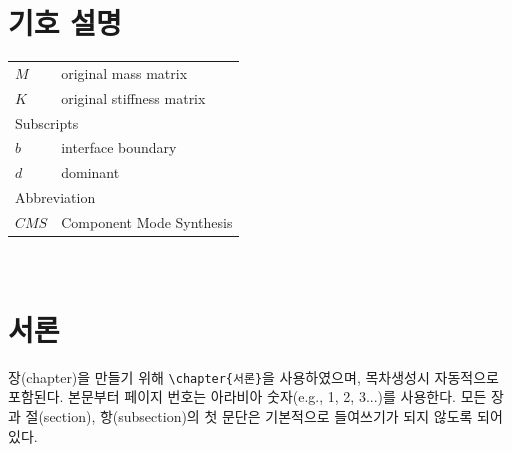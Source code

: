 \documentclass{report}
\begin{document}
\renewcommand{\listtablename}{표 목차}
\listoftables

\renewcommand{\listfigurename}{그림 목차}
\listoffigures

\chapter*{기호 설명}
\begin{tabular}{p{}p{}}
$M$	& original mass matrix\\
$K$	& original stiffness matrix\\[30pt]
\multicolumn{2}{l}{Subscripts}\\
$b$ & interface boundary\\
$d$ & dominant\\[30pt]
\multicolumn{2}{l}{Abbreviation}\\
$CMS$ & Component Mode Synthesis\\
\end{tabular}

\newpage 
~%

\chapter{서론}\label{chap:intro}
장(chapter)을 만들기 위해 \verb|\chapter{서론}|을 사용하였으며, 목차생성시 자동적으로 포함된다.
본문부터 페이지 번호는 아라비아 숫자(e.g., 1, 2, 3...)를 사용한다.
모든 장과 절(section), 항(subsection)의 첫 문단은 기본적으로 들여쓰기가 되지 않도록 되어 있다.
\end{document}

